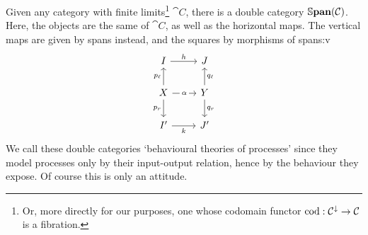 \begin{example}
\label{ex:behav-processes}
	Given any category with finite limits\footnote{Or, more directly for our purposes, one whose codomain functor $\cod:\cat C^\downarrow \to \cat C$ is a fibration.} $\cat C$, there is a double category $\Span(\cat C)$.
	Here, the objects are the same of $\cat C$, as well as the horizontal maps.
	The vertical maps are given by spans instead, and the squares by morphisms of spans:v
	\begin{equation}
		\begin{tikzcd}[ampersand replacement=\&]
			I \& J \\
			X \& Y \\
			{I'} \& {J'}
			\arrow["{p_r}"', from=2-1, to=3-1]
			\arrow["{q_r}", from=2-2, to=3-2]
			\arrow["{p_\ell}", from=2-1, to=1-1]
			\arrow["{q_\ell}"', from=2-2, to=1-2]
			\arrow["\alpha"{description}, from=2-1, to=2-2]
			\arrow["k"', from=3-1, to=3-2]
			\arrow["h", from=1-1, to=1-2]
		\end{tikzcd}
	\end{equation}
	We call these double categories `behavioural theories of processes' since they model processes only by their input-output relation, hence by the behaviour they expose.
	Of course this is only an attitude.
\end{example}
